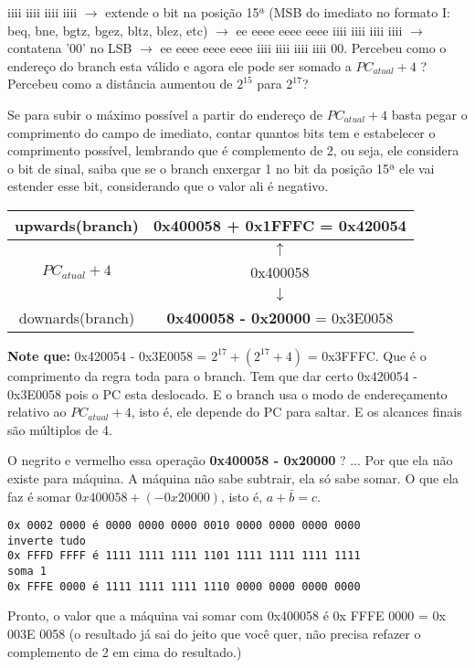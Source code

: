 \documentclass{article}
\begin{document}
iiii iiii iiii iiii $\rightarrow$ extende o bit na posição 15ª (MSB do imediato
no formato I: beq, bne, bgtz, bgez, bltz, blez, etc) $\rightarrow$ ee eeee eeee
eeee iiii iiii iiii iiii $\rightarrow$ contatena '00' no LSB $\rightarrow$ ee
eeee eeee eeee iiii iiii iiii iiii 00. Percebeu como o endereço do branch esta
válido e agora ele pode ser somado a $PC_{atual} + 4$ ? Percebeu como a
distância aumentou de $2^{15}$ para $2^{17}$?

Se para subir o máximo possível a partir do endereço de $PC_{atual} + 4$ basta
pegar o comprimento do campo de imediato, contar quantos bits tem e estabelecer
o comprimento possível, lembrando que é complemento de 2, ou seja, ele considera
o bit de sinal, saiba que se o branch enxergar 1 no bit da posição 15ª ele vai
estender esse bit, considerando que o valor ali é negativo.

\begin{table}[ht!]
\begin{tabular}{|c|c|}
\hline upwards(branch) & 0x400058 + 0x1FFFC = 0x420054 \\
\hline  & $\uparrow$ \\
\hline $PC_{atual} + 4$ & 0x400058 \\
\hline  & $\downarrow$ \\
\hline downards(branch) & \textbf{\color{Red} 0x400058 - 0x20000} = 0x3E0058 \\
\hline
\end{tabular}
\end{table}

\textbf{Note que:} 0x420054 - 0x3E0058 = $2^{17} + (2^{17} + 4)$ = 0x3FFFC. Que
é o comprimento da regra toda para o branch. Tem que dar certo  0x420054 -
0x3E0058 pois o PC esta deslocado. E o branch usa o modo de endereçamento
relativo ao $PC_{atual} + 4$, isto é, ele depende do PC para saltar. E os
alcances finais são múltiplos de 4.

O negrito e vermelho essa operação \textbf{\color{Red} 0x400058 - 0x20000} ? ...
Por que ela não existe para máquina. A máquina não sabe subtrair, ela só sabe
somar. O que ela faz é somar $0x400058 + (-0x20000)$, isto é, $a +
\bar{b} =
c$.

\begin{verbatim}
0x 0002 0000 é 0000 0000 0000 0010 0000 0000 0000 0000
inverte tudo
0x FFFD FFFF é 1111 1111 1111 1101 1111 1111 1111 1111
soma 1
0x FFFE 0000 é 1111 1111 1111 1110 0000 0000 0000 0000
\end{verbatim}

Pronto, o valor que a máquina vai somar com 0x400058 é 0x FFFE 0000 = 0x 003E
0058 (o resultado já sai do jeito que você quer, não precisa refazer o
complemento de 2 em cima do resultado.)
\end{document}
